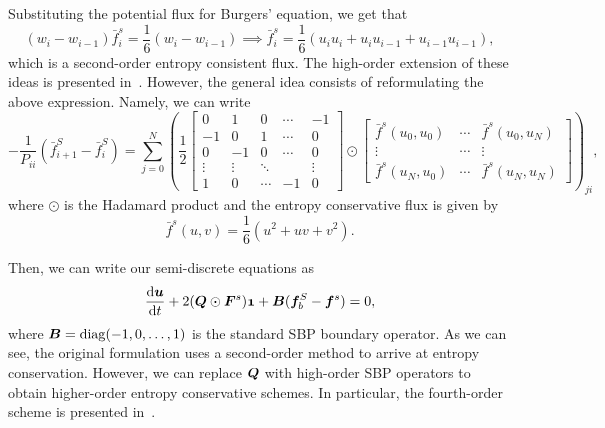 \documentclass{scrartcl}
\begin{document}
Substituting the potential flux for Burgers' equation, we get that
\[
(w_i - w_{i - 1}) \bar{f}^s_i = \frac{1}{6} (w_{i} - w_{i - 1})
\implies
\bar{f}^s_i =  \frac{1}{6} (u_i u_i + u_i u_{i - 1} + u_{i - 1} u_{i - 1}),
\]
which is a second-order entropy consistent flux. The high-order extension of
these ideas is presented in~. However, the general idea
consists of reformulating the above expression. Namely, we can write
\[
-\frac{1}{P_{ii}} (\bar{f}^S_{i + 1} - \bar{f}^S_i) =
\sum_{j = 0}^N \left(
\frac{1}{2}
\begin{bmatrix}
0 & 1 & 0 & \cdots & -1 \\
-1 & 0 & 1 & \cdots & 0 \\
0 & -1 & 0 & \cdots & 0 \\
\vdots & \vdots & \ddots & & \vdots \\
1 & 0 & \cdots & -1 & 0
\end{bmatrix}
\odot
\begin{bmatrix}
\bar{f}^s(u_0, u_0) & \cdots & \bar{f}^s(u_0, u_N) \\
\vdots & \cdots & \vdots \\
\bar{f}^s(u_N, u_0) & \cdots & \bar{f}^s(u_N, u_N)
\end{bmatrix}
\right)_{ji},
\]
where $\odot$ is the Hadamard product and the entropy conservative flux is given
by
\[
\bar{f}^s(u, v) = \frac{1}{6} (u^2 + uv + v^2).
\]

Then, we can write our semi-discrete equations as
\[
\od{\vect{u}}{t}
+ 2 (\vect{Q} \odot \vect{F}^s) \vect{1}
+ \vect{B} (\vect{f}^S_b - \vect{f}^s) = 0,
\]
where $\vect{B} = \operatorname{diag}(-1, 0, \dots, 1)$ is the standard SBP
boundary operator. As we can see, the original formulation uses a second-order
method to arrive at entropy conservation. However, we can replace $\vect{Q}$
with high-order SBP operators to obtain higher-order entropy conservative
schemes. In particular, the fourth-order scheme is presented in~.

\end{document}
